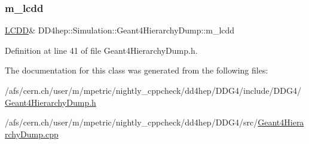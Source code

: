 \subsubsection{\texorpdfstring{m\+\_\+lcdd}{m\_lcdd}}
{\footnotesize\ttfamily \hyperlink{class_d_d4hep_1_1_simulation_1_1_geant4_hierarchy_dump_a4b0ebc3e2346d0ff1c40293d4610f560}{L\+C\+DD}\& D\+D4hep\+::\+Simulation\+::\+Geant4\+Hierarchy\+Dump\+::m\+\_\+lcdd}



Definition at line 41 of file Geant4\+Hierarchy\+Dump.\+h.



The documentation for this class was generated from the following files\+:\begin{DoxyCompactItemize}
\item 
/afs/cern.\+ch/user/m/mpetric/nightly\+\_\+cppcheck/dd4hep/\+D\+D\+G4/include/\+D\+D\+G4/\hyperlink{_geant4_hierarchy_dump_8h}{Geant4\+Hierarchy\+Dump.\+h}\item 
/afs/cern.\+ch/user/m/mpetric/nightly\+\_\+cppcheck/dd4hep/\+D\+D\+G4/src/\hyperlink{_geant4_hierarchy_dump_8cpp}{Geant4\+Hierarchy\+Dump.\+cpp}\end{DoxyCompactItemize}
